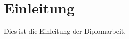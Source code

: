 \documentclass[12pt, a4paper]{article}
\begin{document}
\newpage
\tableofcontents
\newpage

\pagestyle{plain}  %

\section{Einleitung}
Dies ist die Einleitung der Diplomarbeit.




\end{document}
